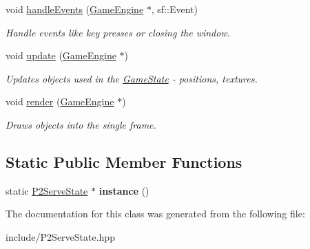\begin{DoxyCompactItemize}
void \mbox{\hyperlink{class_p2_serve_state_af7634dd3bdfca0279b5c9abc6632b2e4}{handle\+Events}} (\mbox{\hyperlink{class_game_engine}{Game\+Engine}} $\ast$, sf\+::\+Event)
\begin{DoxyCompactList}\small\item\em Handle events like key presses or closing the window. \end{DoxyCompactList}\item 
\mbox{\label{class_p2_serve_state_a1f0ddd25c72c4e9033418a32f5389e22}} 
void \mbox{\hyperlink{class_p2_serve_state_a1f0ddd25c72c4e9033418a32f5389e22}{update}} (\mbox{\hyperlink{class_game_engine}{Game\+Engine}} $\ast$)
\begin{DoxyCompactList}\small\item\em Updates objects used in the \mbox{\hyperlink{class_game_state}{Game\+State}} -\/ positions, textures. \end{DoxyCompactList}\item 
\mbox{\label{class_p2_serve_state_acc6d131c7a5712a643b7f97c3bcdbd46}} 
void \mbox{\hyperlink{class_p2_serve_state_acc6d131c7a5712a643b7f97c3bcdbd46}{render}} (\mbox{\hyperlink{class_game_engine}{Game\+Engine}} $\ast$)
\begin{DoxyCompactList}\small\item\em Draws objects into the single frame. \end{DoxyCompactList}\end{DoxyCompactItemize}
\subsection*{Static Public Member Functions}
\begin{DoxyCompactItemize}
\item 
\mbox{\label{class_p2_serve_state_ab33721553cd862745bb721fcab45b104}} 
static \mbox{\hyperlink{class_p2_serve_state}{P2\+Serve\+State}} $\ast$ {\bfseries instance} ()
\end{DoxyCompactItemize}


The documentation for this class was generated from the following file\+:\begin{DoxyCompactItemize}
\item 
include/P2\+Serve\+State.\+hpp\end{DoxyCompactItemize}
